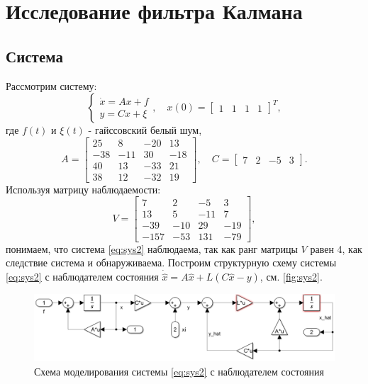 \newpage \section{Исследование фильтра Калмана}
\subsection{Система}
Рассмотрим систему:
\begin{equation}
    \label{eq:sys2}
    \begin{cases}
        \dot x=Ax+f\\
        y=Cx+\xi
    \end{cases},\quad
    x(0)=\begin{bmatrix}
        1&1&1&1
    \end{bmatrix}^T,
\end{equation}
где $f(t)$ и $\xi(t)$ - гайссовский белый шум,
\begin{equation*}
    A=\begin{bmatrix}
        25 & 8 & -20 & 13 \\
        -38 & -11 & 30 & -18 \\
        40 & 13 & -33 & 21 \\
        38 & 12 & -32 & 19
        \end{bmatrix},\quad
        C=\begin{bmatrix}
        7 & 2 & -5 & 3
        \end{bmatrix}.
\end{equation*}
Используя матрицу наблюдаемости:
\begin{equation*}
    V=\begin{bmatrix}
        7 & 2 & -5 & 3 \\
        13 & 5 & -11 & 7 \\
        -39 & -10 & 29 & -19 \\
        -157 & -53 & 131 & -79
    \end{bmatrix},
\end{equation*}
понимаем, что система \eqref{eq:sys2} наблюдаема, так как ранг матрицы $V$ равен 4,
как следствие система и обнаруживаема.
Построим структурную схему системы \eqref{eq:sys2} с наблюдателем состояния
$\dot{\hat x}=A\hat x+L(C\hat x-y)$, см. \autoref{fig:sys2}.
\begin{figure}[H]
    \centering
    \includegraphics[width=1\linewidth]{figs/2_slx.png}
    \caption{Схема моделирования системы \eqref{eq:sys2} с наблюдателем состояния}
    \label{fig:sys2}
\end{figure}

